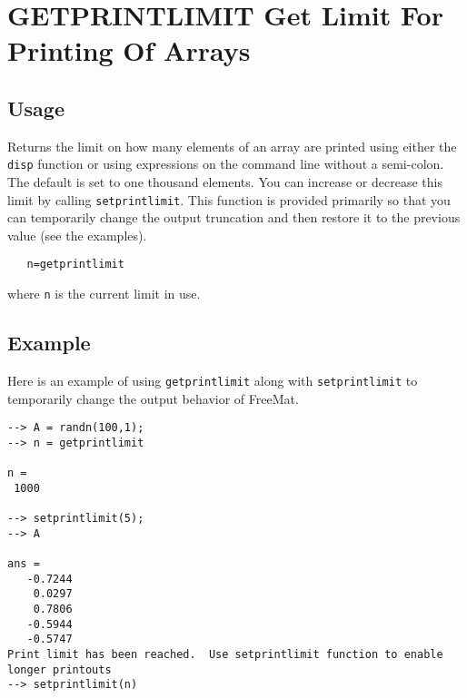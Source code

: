 \section{GETPRINTLIMIT Get Limit For Printing Of Arrays}

\subsection{Usage}

Returns the limit on how many elements of an array are printed
using either the \verb|disp| function or using expressions on the
command line without a semi-colon.  The default is set to 
one thousand elements.  You can increase or decrease this
limit by calling \verb|setprintlimit|.  This function is provided
primarily so that you can temporarily change the output truncation
and then restore it to the previous value (see the examples).
\begin{verbatim}
   n=getprintlimit
\end{verbatim}
where \verb|n| is the current limit in use.
\subsection{Example}

Here is an example of using \verb|getprintlimit| along with \verb|setprintlimit| to temporarily change the output behavior of FreeMat.
\begin{verbatim}
--> A = randn(100,1);
--> n = getprintlimit

n = 
 1000 

--> setprintlimit(5);
--> A

ans = 
   -0.7244 
    0.0297 
    0.7806 
   -0.5944 
   -0.5747
Print limit has been reached.  Use setprintlimit function to enable longer printouts
--> setprintlimit(n)
\end{verbatim}
